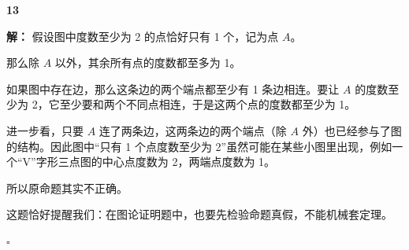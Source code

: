 \documentclass[11pt,a4paper,fontset=fandol]{ctexart}
\theoremstyle{formalexample}
\newenvironment{solution}{\par\noindent\textbf{解：}}{\hfill$\square$\par}
\begin{document}
\textbf{13}\begin{solution}
假设图中度数至少为 2 的点恰好只有 1 个，记为点 $A$。

那么除 $A$ 以外，其余所有点的度数都至多为 1。

如果图中存在边，那么这条边的两个端点都至少有 1 条边相连。要让 $A$ 的度数至少为 2，它至少要和两个不同点相连，于是这两个点的度数都至少为 1。

进一步看，只要 $A$ 连了两条边，这两条边的两个端点（除 $A$ 外）也已经参与了图的结构。因此图中“只有 1 个点度数至少为 2”虽然可能在某些小图里出现，例如一个“V”字形三点图的中心点度数为 2，两端点度数为 1。

所以原命题其实不正确。

这题恰好提醒我们：在图论证明题中，也要先检验命题真假，不能机械套定理。

\begin{center}
\end{center}
\end{solution}
\end{document}
